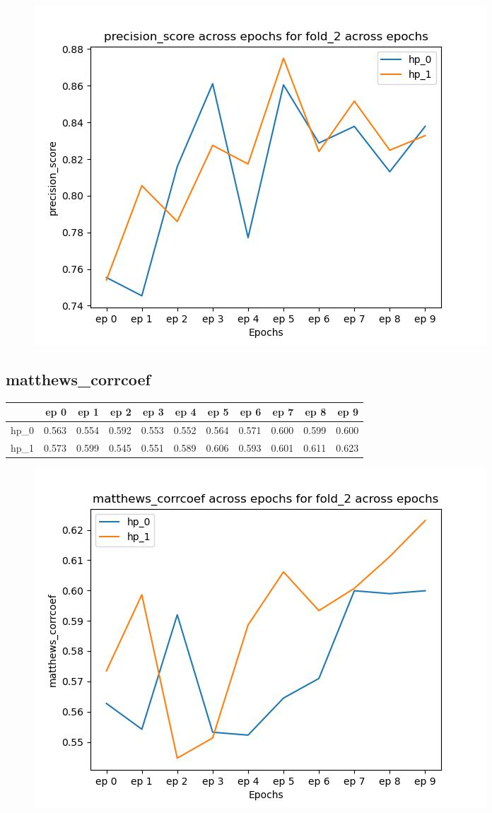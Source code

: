 \documentclass{article}
\begin{document}
\begin{figure}[H]
\includegraphics[scale = 0.75]{fold_2/precision_score}
\end{figure}
\subsection{matthews\_corrcoef}
\begin{tabular}{lrrrrrrrrrr}
\toprule
{} &   ep 0 &   ep 1 &   ep 2 &   ep 3 &   ep 4 &   ep 5 &   ep 6 &   ep 7 &   ep 8 &   ep 9 \\
\midrule
hp\_0 &  0.563 &  0.554 &  0.592 &  0.553 &  0.552 &  0.564 &  0.571 &  0.600 &  0.599 &  0.600 \\
hp\_1 &  0.573 &  0.599 &  0.545 &  0.551 &  0.589 &  0.606 &  0.593 &  0.601 &  0.611 &  0.623 \\
\bottomrule
\end{tabular}

\begin{figure}[H]
\includegraphics[scale = 0.75]{fold_2/matthews_corrcoef}
\end{figure}
\end{document}
